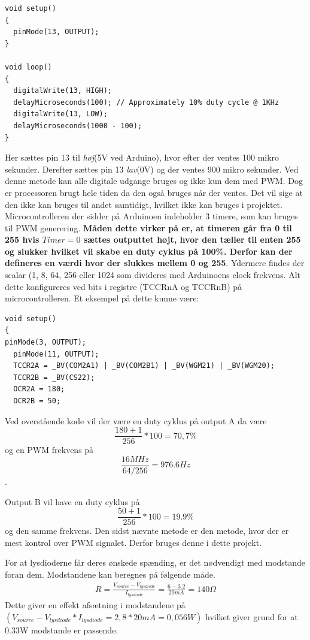 \begin{lstlisting}
void setup()
{
  pinMode(13, OUTPUT);
}

void loop()
{
  digitalWrite(13, HIGH);
  delayMicroseconds(100); // Approximately 10% duty cycle @ 1KHz
  digitalWrite(13, LOW);
  delayMicroseconds(1000 - 100);
}
\end{lstlisting}

Her sættes pin 13 til \textit{høj}(5V ved Arduino), hvor efter der ventes 100 mikro sekunder. Derefter sættes pin 13 \textit{lav}(0V) og der ventes 900 mikro sekunder. Ved denne metode kan alle digitale udgange bruges og ikke kun dem med PWM. Dog er processoren brugt hele tiden da den også bruges når der ventes. Det vil sige at den ikke kan bruges til andet samtidigt, hvilket ikke kan bruges i projektet.
Microcontrolleren der sidder på Arduinoen indeholder 3 timere, som kan bruges til PWM generering.  \textbf{Måden dette virker på er, at timeren går fra 0 til 255 hvis $Timer=0$ sættes outputtet højt, hvor den tæller til enten 255 og slukker hvilket vil skabe en duty cyklus på 100\%. Derfor kan der defineres en værdi hvor der slukkes mellem 0 og 255}. Ydermere findes der scalar (1, 8, 64, 256 eller 1024 som divideres med Arduinoens clock frekvens. Alt dette konfigureres ved bits i registre (TCCRnA og TCCRnB) på microcontrolleren. Et eksempel på dette kunne være: 

\begin{lstlisting}
void setup()
{
pinMode(3, OUTPUT);
  pinMode(11, OUTPUT);
  TCCR2A = _BV(COM2A1) | _BV(COM2B1) | _BV(WGM21) | _BV(WGM20);
  TCCR2B = _BV(CS22);
  OCR2A = 180;
  OCR2B = 50;
\end{lstlisting}

Ved overstående kode vil der være en duty cyklus på output A da være $$\frac{180+1}{256}*100=70,7\%$$ og en PWM frekvens på     
  $$\frac{16MHz}{64/256}=976.6Hz$$. 
  
Output B vil have en duty cyklus på $$\frac{50+1}{256}*100=19.9 \%$$ og den samme frekvens. Den sidst nævnte metode er den metode, hvor der er mest kontrol over PWM signalet. Derfor bruges denne i dette projekt.
  
For at lysdioderne får deres ønskede spænding, er det nødvendigt med modstande foran dem. Modstandene kan beregnes på følgende måde. 
\begin{align}
R=\frac{V_{source}-V_{lysdiode}}{I_{lysdiode}}=\frac{6-3.2}{20mA}=140\Omega
\label{eq:modstandLEDmotor}
\end{align} 
Dette giver en effekt afsætning i modstandene på $(V_{source}-V_{lysdiode}*I_{lysdiode}=2,8*20mA=0,056W)$ hvilket giver grund for at 0.33W modstande er passende.

